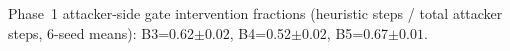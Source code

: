 Phase~1 attacker-side gate intervention fractions (heuristic steps / total attacker steps, 6-seed means): B3=0.62${\pm}0.02$, B4=0.52${\pm}0.02$, B5=0.67${\pm}0.01$.
